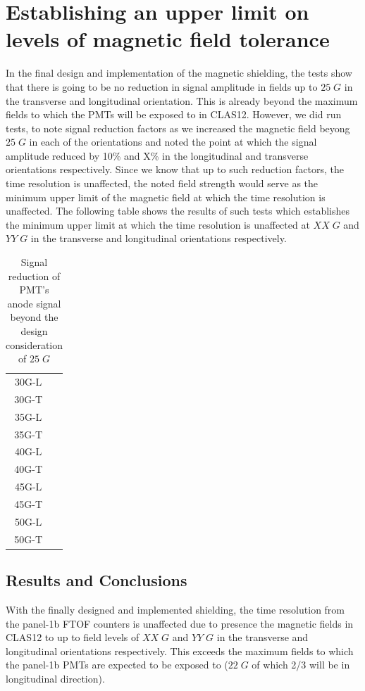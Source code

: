 \documentclass[12pt]{article}
\begin{document}
\section{Establishing an upper limit on levels of magnetic field tolerance}
In the final design and implementation of the magnetic shielding, the tests show that there is going to be no reduction in signal amplitude in fields up to $25\;G$ in the transverse and longitudinal orientation. This is already beyond the maximum fields to which the PMTs will be exposed to in CLAS12. However, we did run tests, to note signal reduction factors as we increased the magnetic field beyong $25\;G$ in each of the orientations and noted the point at which the signal amplitude reduced by 10\% and X\% in the longitudinal and transverse orientations respectively. Since we know that up to such reduction factors, the time resolution is unaffected, the noted field strength would serve as the minimum upper limit of the magnetic field at which the time resolution is unaffected. The following table shows the results of such tests which establishes the minimum upper limit at which the time resolution is unaffected at $XX\;G$ and $YY\;G$ in the transverse and longitudinal orientations respectively.

\begin{table}[H]
	\begin{center}
		\begin{tabular}{|c|c|}
			\hline
			30G-L &  \\
 			30G-T &  \\ 
 			\hline
 			35G-L &  \\
 			35G-T &  \\
 			\hline
 			40G-L &  \\
 			40G-T &  \\
 			\hline
 			45G-L & \\
 			45G-T &  \\
 			\hline
 			50G-L &  \\
 			50G-T &  \\
 			\hline
 		\end{tabular}
	\end{center}
	\caption{Signal reduction of PMT's anode signal beyond the design consideration of $25\;G$}
\end{table}


\subsection{Results and Conclusions}
With the finally designed and implemented shielding, the time resolution from the panel-1b FTOF counters is unaffected due to presence the magnetic fields in CLAS12 to up to field levels of $XX\;G$ and $YY\;G$ in the transverse and longitudinal orientations respectively. This exceeds the maximum fields to which the panel-1b PMTs are expected to be exposed to ($22\;G$ of which 2/3 will be in longitudinal direction). 



\label{bib}


\end{document}
